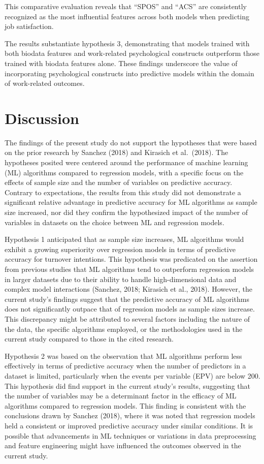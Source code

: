 \documentclass[
  man]{apa7}
\begin{document}
This comparative evaluation reveals that ``SPOS'' and ``ACS'' are consistently recognized as the most influential features across both models when predicting job satisfaction.

The results substantiate hypothesis 3, demonstrating that models trained with both biodata features and work-related psychological constructs outperform those trained with biodata features alone. These findings underscore the value of incorporating psychological constructs into predictive models within the domain of work-related outcomes.

\hypertarget{discussion}{%
\section{Discussion}\label{discussion}}

The findings of the present study do not support the hypotheses that were based on the prior research by Sanchez (2018) and Kirasich et al.~(2018). The hypotheses posited were centered around the performance of machine learning (ML) algorithms compared to regression models, with a specific focus on the effects of sample size and the number of variables on predictive accuracy. Contrary to expectations, the results from this study did not demonstrate a significant relative advantage in predictive accuracy for ML algorithms as sample size increased, nor did they confirm the hypothesized impact of the number of variables in datasets on the choice between ML and regression models.

Hypothesis 1 anticipated that as sample size increases, ML algorithms would exhibit a growing superiority over regression models in terms of predictive accuracy for turnover intentions. This hypothesis was predicated on the assertion from previous studies that ML algorithms tend to outperform regression models in larger datasets due to their ability to handle high-dimensional data and complex model interactions (Sanchez, 2018; Kirasich et al., 2018). However, the current study's findings suggest that the predictive accuracy of ML algorithms does not significantly outpace that of regression models as sample sizes increase. This discrepancy might be attributed to several factors including the nature of the data, the specific algorithms employed, or the methodologies used in the current study compared to those in the cited research.

Hypothesis 2 was based on the observation that ML algorithms perform less effectively in terms of predictive accuracy when the number of predictors in a dataset is limited, particularly when the events per variable (EPV) are below 200. This hypothesis did find support in the current study's results, suggesting that the number of variables may be a determinant factor in the efficacy of ML algorithms compared to regression models. This finding is consistent with the conclusions drawn by Sanchez (2018), where it was noted that regression models held a consistent or improved predictive accuracy under similar conditions. It is possible that advancements in ML techniques or variations in data preprocessing and feature engineering might have influenced the outcomes observed in the current study.
\end{document}
